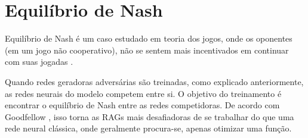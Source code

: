 \section{Equilíbrio de Nash}
\label{sec:nash}

Equilíbrio de Nash é um caso estudado em teoria dos jogos, onde os oponentes (em um jogo não cooperativo), não se sentem mais incentivados em continuar com suas jogadas \cite{chen_nash_2022, eldridge_nash_2022}. 

Quando redes geradoras adversárias são treinadas, como explicado anteriormente, as redes neurais do modelo competem entre si. O objetivo do treinamento é encontrar o equilíbrio de Nash entre as redes competidoras. De acordo com Goodfellow \cite{goodfellow_nips_2017}, isso torna as RAGs mais desafiadoras de se trabalhar do que uma rede neural clássica, onde geralmente procura-se, apenas otimizar uma função. 
